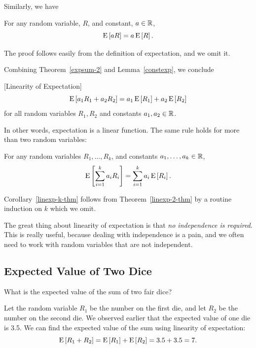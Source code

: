 \documentclass[11pt,twoside]{article}
\begin{document}
Similarly, we have
\begin{lemma}\label{constexp}
For any random variable, $R$, and constant, $a \in \mathbb{R}$,
\begin{equation*}
\mathop{\textup{E}}\nolimits\left[aR\right] = a\mathop{\textup{E}}\nolimits\left[R\right].
\end{equation*}
\end{lemma}
The proof follows easily from the definition of expectation, and we omit
it.

Combining Theorem~\ref{expsum-2} and Lemma~\ref{constexp}, we conclude
\begin{theorem}\label{linexp-2-thm}[Linearity of Expectation]
\[
\mathop{\textup{E}}\nolimits\left[a_1R_1 + a_2R_2\right] = a_1\mathop{\textup{E}}\nolimits\left[R_1\right] + a_2\mathop{\textup{E}}\nolimits\left[R_2\right]
\]
for all random variables $R_1,R_2$ and constants $a_1,a_2 \in \mathbb{R}$.
\end{theorem}
In other words, expectation is a linear function.  The same rule holds
for more than two random variables:
\begin{corollary}\label{linexp-k-thm}
For any random variables $R_1, \dots, R_k$, and constants $a_1, \dots, a_k
\in \mathbb{R}$,
\[
\mathop{\textup{E}}\nolimits\left[\sum_{i=1}^k a_iR_i\right] = \sum_{i=1}^k a_i\mathop{\textup{E}}\nolimits\left[R_i\right].
\]
\end{corollary}
Corollary~\ref{linexp-k-thm} follows from Theorem~\ref{linexp-2-thm} by a
routine induction on $k$ which we omit.

The great thing about linearity of expectation is that \emph{no
independence is required}.  This is really useful, because dealing with
independence is a pain, and we often need to work with random variables
that are not independent.

\subsection{Expected Value of Two Dice}

What is the expected value of the sum of two fair dice?

Let the random variable $R_1$ be the number on the first die, and let
$R_2$ be the number on the second die.  We observed earlier that the
expected value of one die is 3.5.  We can find the expected value of the
sum using linearity of expectation:
\begin{equation*}
\mathop{\textup{E}}\nolimits\left[R_1 + R_2\right] 
 =   \mathop{\textup{E}}\nolimits\left[R_1\right] + \mathop{\textup{E}}\nolimits\left[R_2\right]
 =    3.5 + 3.5
 =    7.
\end{equation*}
\end{document}
